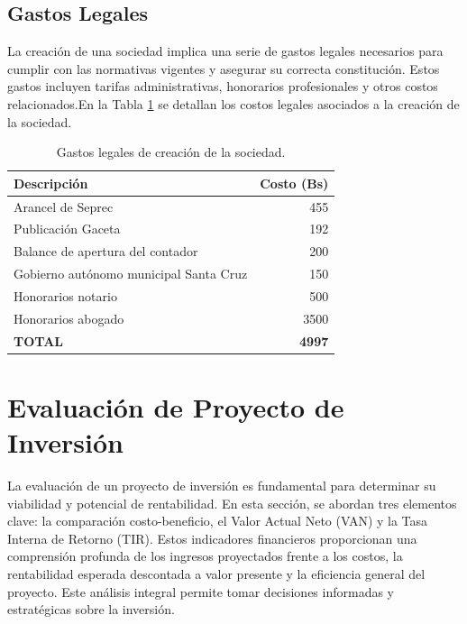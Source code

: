 \subsection{Gastos Legales}

La creación de una sociedad implica una serie de gastos legales necesarios para cumplir con las normativas vigentes y asegurar su correcta constitución. Estos gastos incluyen tarifas administrativas, honorarios profesionales y otros costos relacionados.En la Tabla \ref{tab:costos_legales} se detallan los costos legales asociados a la creación de la sociedad.

\begin{table}[ht]
    \centering
    \caption{Gastos legales de creación de la sociedad.}
    \label{tab:costos_legales}
    \begin{tabularx}{\textwidth}{|X|r|} 
        \hline
        \textbf{Descripción} & \textbf{Costo (Bs)} \\ \hline
        Arancel de Seprec & 455 \\ 
        Publicación Gaceta & 192 \\ 
        Balance de apertura del contador & 200 \\ 
        Gobierno autónomo municipal Santa Cruz & 150 \\ 
        Honorarios notario & 500 \\ 
        Honorarios abogado & 3500 \\ \hline
        \textbf{TOTAL} & \textbf{4997} \\ \hline
    \end{tabularx}
\end{table}

\section{Evaluación de Proyecto de Inversión}
La evaluación de un proyecto de inversión es fundamental para determinar su viabilidad y potencial de rentabilidad. En esta sección, se abordan tres elementos clave: la comparación costo-beneficio, el Valor Actual Neto (VAN) y la Tasa Interna de Retorno (TIR). Estos indicadores financieros proporcionan una comprensión profunda de los ingresos proyectados frente a los costos, la rentabilidad esperada descontada a valor presente y la eficiencia general del proyecto. Este análisis integral permite tomar decisiones informadas y estratégicas sobre la inversión.

